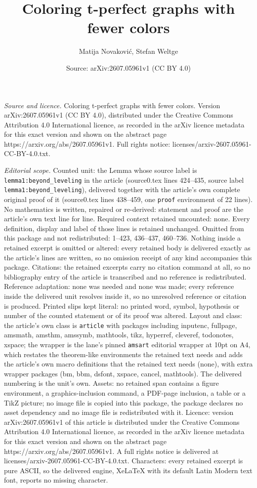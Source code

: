 \documentclass[10pt,a4paper]{amsart}
\title[Coloring t-perfect graphs with fewer colors]{Coloring t-perfect graphs with fewer colors}
\author{Matija Novakovi\'c, Stefan Weltge}
\date{Source: arXiv:2607.05961v1 (CC BY 4.0)}
\begin{document}
\maketitle

\noindent\emph{Source and licence.} Coloring t-perfect graphs with fewer colors. Version arXiv:2607.05961v1 (CC BY 4.0), distributed under the Creative Commons Attribution 4.0 International licence, as recorded in the arXiv licence metadata for this exact version and shown on the abstract page https://arxiv.org/abs/2607.05961v1. Full rights notice: licenses/arxiv-2607.05961-CC-BY-4.0.txt.\par\smallskip

\noindent\textit{Editorial scope.} Counted unit: the Lemma whose source label is \texttt{lemma1:beyond\_leveling} in the article (source0.tex lines 424--435, source label \texttt{lemma1:beyond\_leveling}), delivered together with the article's own complete original proof of it (source0.tex lines 438--459, one \texttt{proof} environment of 22 lines). No mathematics is written, repaired or re-derived: statement and proof are the article's own text line for line. Required context retained uncounted: none. Every definition, display and label of those lines is retained unchanged. Omitted from this package and not redistributed: 1--423, 436--437, 460--736. Nothing inside a retained excerpt is omitted or altered: every retained body is delivered exactly as the article's lines are written, so no omission receipt of any kind accompanies this package. Citations: the retained excerpts carry no citation command at all, so no bibliography entry of the article is transcribed and no reference is redistributed. Reference adaptation: none was needed and none was made; every reference inside the delivered unit resolves inside it, so no unresolved reference or citation is produced. Printed slips kept literal: no printed word, symbol, hypothesis or number of the counted statement or of its proof was altered. Layout and class: the article's own class is \texttt{article} with packages including inputenc, fullpage, amsmath, amsthm, amssymb, mathtools, tikz, hyperref, cleveref, todonotes, xspace; the wrapper is the lane's pinned \texttt{amsart} editorial wrapper at 10pt on A4, which restates the theorem-like environments the retained text needs and adds the article's own macro definitions that the retained text needs (none), with extra wrapper packages (bm, bbm, dsfont, xspace, cancel, mathtools). The delivered numbering is the unit's own. Assets: no retained span contains a figure environment, a graphics-inclusion command, a PDF-page inclusion, a table or a TikZ picture; no image file is copied into this package, the package declares no asset dependency and no image file is redistributed with it. Licence: version arXiv:2607.05961v1 of this article is distributed under the Creative Commons Attribution 4.0 International licence, as recorded in the arXiv licence metadata for this exact version and shown on the abstract page https://arxiv.org/abs/2607.05961v1. A full rights notice is delivered at licenses/arxiv-2607.05961-CC-BY-4.0.txt. Characters: every retained excerpt is pure ASCII, so the delivered engine, XeLaTeX with its default Latin Modern text font, reports no missing character.
\end{document}
